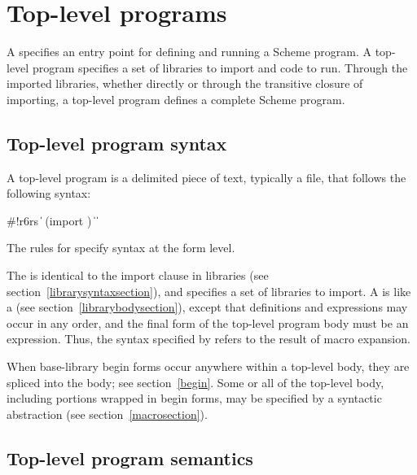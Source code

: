 \chapter{Top-level programs}
\label{programchapter}

A  specifies an entry point for defining and running
a Scheme program.  A top-level program specifies a set of libraries to import and
code to run.  Through the imported libraries, whether directly or through the
transitive closure of importing, a top-level program defines a complete Scheme
program.

\section{Top-level program syntax}

A top-level program is a delimited piece of text, typically a file, that follows
the following syntax:

\begin{grammar}
 \: \#!r6rs  
  \> \|  
 \: (import )
 \:  
 \: \| 
\> \| 
\end{grammar}

The rules for  specify syntax at the form level.

The  is identical to the import clause in
libraries (see section~\ref{librarysyntaxsection}), 
and specifies a set of libraries to import.  A  is like a  (see
section~\ref{librarybodysection}), except that 
definitions and expressions may occur in any order, and the final
form of the top-level program body must be an expression.  Thus, the syntax
specified by  refers to the result of macro
expansion.

When base-library {\cf begin} forms occur anywhere within a top-level body,
they are spliced into the body; see section~\ref{begin}.
Some or all of the top-level body, including portions wrapped in {\cf begin}
forms, may be specified by a syntactic abstraction
(see section~\ref{macrosection}).

\section{Top-level program semantics}

